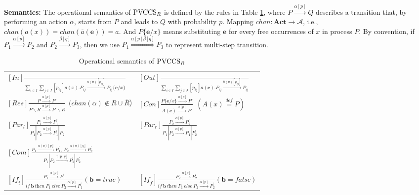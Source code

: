 \documentclass{acm_proc_article-sp}
\begin{document}
\textbf{Semantics:}
The operational semantics of $\rm{PVCCS_{\textit{R}}}$ is defined by the rules in Table \ref{operationalsemanticspvccs}, where $P\stackrel{\alpha[p]}{\rightarrow}Q$ describes a transition that, by performing an action $\alpha$, starts from $P$ and leads to $Q$ with probability $p$. Mapping $chan:\mathbf{Act}\rightarrow \mathcal{A}$, i.e., $chan(a(x))=chan(\overline{a}(\mathbf{e}))=a$. And $P\{\mathbf{e}/x\}$ means substituting $\mathbf{e}$ for every free occurrences of $x$ in process $P$. By convention, if $P_{1}\stackrel{\alpha[p]}{\rightarrow}P_{2}$ and $P_{2}\stackrel{\beta[q]}{\rightarrow}P_{3}$, then we use $P_{1}\stackrel{\alpha[p]\beta[q]}{\Longrightarrow}P_{3}$ to represent multi-step transition.
\begin{table*}
\centering
\renewcommand{\arraystretch}{2.5}
\begin{tabular}{ll}\hline
$[In]\frac{}{\underset{i\in I}{\sum}\underset{j\in J}{\sum}[p_{\textit{ij}}]a(x).P_{\textit{ij}}\stackrel{a(\mathbf{e})[p_{\textit{ij}}]} {\longrightarrow}P_{\textit{ij}}\{\mathbf{e}/x\}}$&
$[Out]\frac{}{\underset{i\in I}{\sum}\underset{j\in J}{\sum}[p_{\textit{ij}}]\overline{a}(\mathbf{e}).P_{\textit{ij}} \stackrel{\overline{a}(\mathbf{e})[p_{\textit{ij}}]}{\longrightarrow}P_{\textit{ij}}} $\\
$[Res] \frac{P\stackrel{\alpha[p]}{\longrightarrow}P'}{P\backslash R\stackrel{\alpha[p]}{\longrightarrow}P'\backslash R}~~(chan(\alpha)\notin R\cup \overline{R}$) &
$[Con]\frac{P\{\mathbf{e}/x\}\stackrel{\alpha[p]}{\longrightarrow} P'}{A(\mathbf{e})\stackrel{\alpha[p]}{\longrightarrow}P'}~~(A(x)\stackrel{\textit{def}} {=}P)   $\\
$[\textit{Par}_{\textit{l}}] \frac{P_1\stackrel{\alpha[p]}{\longrightarrow}P_1^{'}}{P_1|P_2\stackrel{\alpha [p]}{\longrightarrow}P_1^{'}|P_2}$&
$[\textit{Par}_{\textit{r}}] \frac{P_2\stackrel{\alpha[p]}{\longrightarrow}P_2^{'}}{P_1|P_2\stackrel{\alpha [p]}{\longrightarrow}P_1|P_2^{'}} $\\
$[Com]\frac{P_1\stackrel{a(\mathbf{e})[p]}{\longrightarrow}P_1^{'},~ P_2\stackrel {\overline{a}(\mathbf{e})[q]}{\longrightarrow}P_2^{'}}{P_1|P_2\stackrel{\tau[p\cdot q]}{\longrightarrow}P_1^{'}|P_2^{'}}$ & $ $\\
$[\textit{If}_{\textit{t}}]\frac{P_{1}\stackrel{\alpha[p]}{\longrightarrow}P_{1}^{'}} {\textit{if}~\mathbf{b}~\textit{then}~P_1~\textit{else}~P_2\stackrel{\alpha[p]} {\longrightarrow}P_{1}^{'}}(\mathbf{b}=true)  $ & $ [\textit{If}_{\textit{f}}]\frac{P_{2}\stackrel{\alpha[p]}{\longrightarrow}P_{2}^{'}} {\textit{if}~\mathbf{b}~\textit{then}~P_1~\textit{else}~P_2\stackrel{\alpha[p]} {\longrightarrow}P_{2}^{'}}(\mathbf{b}=\textit{false})  $\\
\hline
\end{tabular}
\caption{\label{operationalsemanticspvccs}Operational semantics of $\rm{PVCCS_{\textit{R}}}$}
\end{table*}
\end{document}
